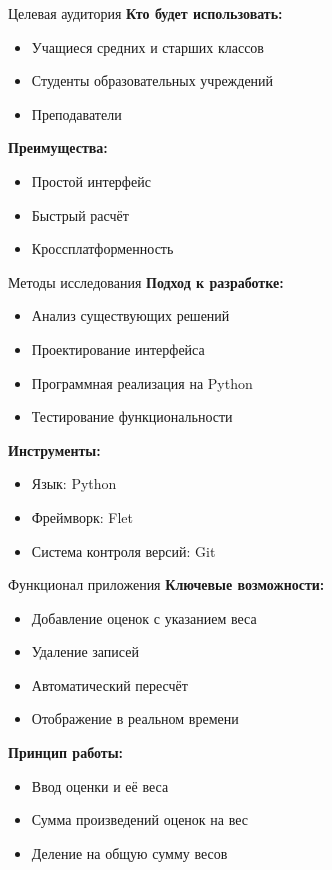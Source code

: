 \documentclass[16pt]{beamer}
\begin{document}
\begin{frame}{Целевая аудитория}
    \textbf{Кто будет использовать:}
    \begin{itemize}
        \item Учащиеся средних и старших классов
        \item Студенты образовательных учреждений
        \item Преподаватели
    \end{itemize}
    
    \vspace{0.3cm}
    \textbf{Преимущества:}
    \begin{itemize}
        \item Простой интерфейс
        \item Быстрый расчёт
        \item Кроссплатформенность
    \end{itemize}
\end{frame}

\begin{frame}{Методы исследования}
    \textbf{Подход к разработке:}
    \begin{itemize}
        \item Анализ существующих решений
        \item Проектирование интерфейса
        \item Программная реализация на Python
        \item Тестирование функциональности
    \end{itemize}
    
    \vspace{0.3cm}
    \textbf{Инструменты:}
    \begin{itemize}
        \item Язык: Python
        \item Фреймворк: Flet
        \item Система контроля версий: Git
    \end{itemize}
\end{frame}

\begin{frame}{Функционал приложения}
    \textbf{Ключевые возможности:}
    \begin{itemize}
        \item Добавление оценок с указанием веса
        \item Удаление записей
        \item Автоматический пересчёт
        \item Отображение в реальном времени
    \end{itemize}
    
    \vspace{0.3cm}
    \textbf{Принцип работы:}
    \begin{itemize}
        \item Ввод оценки и её веса
        \item Сумма произведений оценок на вес
        \item Деление на общую сумму весов
    \end{itemize}
\end{frame}
\end{document}
